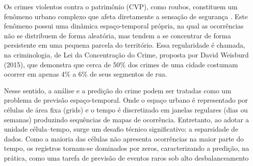 \label{cap:introducao}


Os crimes violentos contra o patrimônio (CVP), como roubos, constituem um fenômeno urbano complexo que afeta diretamente a sensação de segurança \cite{camacho22}. Este fenômeno possui uma dinâmica espaço-temporal própria, na qual as ocorrências não se distribuem de forma aleatória, mas tendem a se concentrar de forma persistente em uma pequena parcela do território. Essa regularidade é chamada, na criminologia, de Lei da Concentração do Crime, proposta por David Weisburd (2015), que demonstra que cerca de 50\% dos crimes de uma cidade costumam ocorrer em apenas 4\% a 6\% de seus segmentos de rua.

Nesse sentido, a análise e a predição do crime podem ser tratadas como um problema de previsão espaço-temporal. Onde o espaço urbano é representado por células de área fixa (grids) e o tempo é discretizado em janelas regulares (dias ou semanas) produzindo sequências de mapas de ocorrência. Entretanto, ao adotar a unidade célula–tempo, surge um desafio técnico significativo: a esparsidade de dados. Como a maioria das células não apresenta ocorrências na maior parte do tempo, os registros tornam-se dominados por zeros, caracterizando a predição, na prática, como uma tarefa de previsão de eventos raros sob alto desbalanceamento \cite{wang2019deep}

